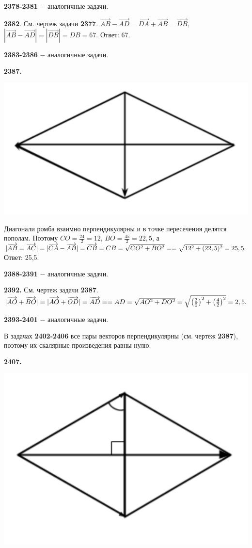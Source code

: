 \textbf{2378-2381} $-$ аналогичные задачи.

\textbf{2382}. См. чертеж задачи \textbf{2377}. $\overrightarrow{AB} - \overrightarrow{AD}=\overrightarrow{DA}+\overrightarrow{AB}=\overrightarrow{DB},$ $|\overrightarrow{AB}-\overrightarrow{AD}|=|\overrightarrow{DB}|=DB=67.$ \newline \null \hspace*{\fill} Ответ: 67.  

\textbf{2383-2386} $-$ аналогичные задачи.

\textbf{2387.}

{\centering \includegraphics[width=0.5\linewidth]{Geometry/Content/58.png}
	
}

Диагонали ромба взаимно перпендикулярны и в точке пересечения делятся пополам. Поэтому $CO=\frac{24}{2}=12$, $BO=\frac{45}{2}=22,5$, а $|\overrightarrow{AB}=\overrightarrow{AC}|=|\overrightarrow{CA}-\overrightarrow{AB}|=\overrightarrow{CB}=CB=\sqrt{CO^2+BO^2}=\linebreak=\sqrt{12^2+(22,5)^2}=25,5.$ \newline \null \hspace*{\fill} Ответ: 25,5.

\textbf{2388-2391} $-$ аналогичные задачи.

\textbf{2392.}  См. чертеж задачи  \textbf{2387}. $|\overrightarrow{AO}+\overrightarrow{BO}|=|\overrightarrow{AO}+\overrightarrow{OD}|=\overrightarrow{AD}=\linebreak=AD=\sqrt{AO^2+DO^2}=\sqrt{\left( \frac{3}{2} \right)^2 + \left( \frac{4}{2} \right)^2}=2,5.$ 

\textbf{2393-2401} $-$ аналогичные задачи.

В задачах \textbf{2402-2406} все пары векторов перпендикулярны (см. чертеж \textbf{2387}), поэтому их скалярные произведения равны нулю.

\textbf{2407.}

{\centering \includegraphics[width=0.5\linewidth]{Geometry/Content/59.png}
	
}

